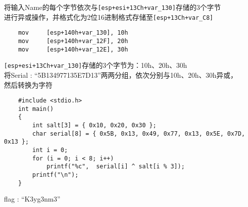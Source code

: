\begin{enumerate}
	将输入Name的每个字节依次与\lstinline$[esp+esi+13Ch+var_130]$存储的3个字节  \\
	进行异或操作，并格式化为2位16进制格式存储至\lstinline$[esp+13Ch+var_C8]$ \\
	\begin{lstlisting}
	mov     [esp+140h+var_130], 10h
	mov     [esp+140h+var_12F], 20h
	mov     [esp+140h+var_12E], 30h
	\end{lstlisting}
	\lstinline$[esp+esi+13Ch+var_130]$存储的3个字节为：10h、20h、30h \\
	将Serial : ``5B134977135E7D13''两两分组，依次分别与10h、20h、30h异或，\\
	然后转换为字符 \\
	\begin{lstlisting}
	#include <stdio.h>
	int main()
	{
		int salt[3] = { 0x10, 0x20, 0x30 };
		char serial[8] = { 0x5B, 0x13, 0x49, 0x77, 0x13, 0x5E, 0x7D, 0x13 };
		int i = 0;
		for (i = 0; i < 8; i++)
			printf("%c",  serial[i] ^ salt[i % 3]);
		printf("\n");
	}
	\end{lstlisting}
	flag : ``K3yg3nm3''

\end{enumerate}